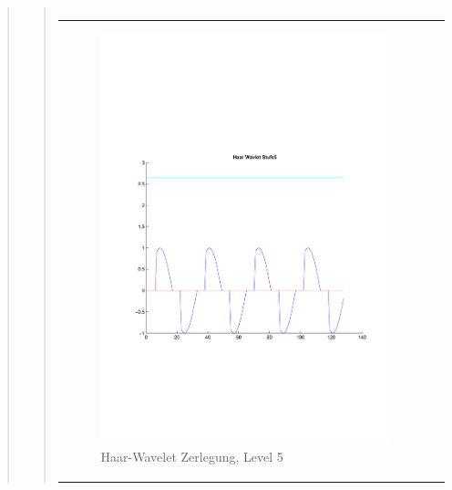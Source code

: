 \begin{quote}
\begin{quote}
\begin{center}
\begin{tabular}{ll}
                \end{tabular}
                \end{center}
    
                
                
                    \begin{center}
                \begin{tabular}{ll}
    
                \hspace{-12em}
                    \begin{minipage}{0.6\textwidth}
    
                        \begin{figure}[H]
                            \label{fig:}
                            \includegraphics[scale=0.45, trim = 0.8cm 6cm 3cm
                            7.5cm,
                            clip]{./Bilder/Termin8/Haar_Wavlet_lvl_5}
                            \caption{Haar-Wavelet Zerlegung, Level 5}
                        \end{figure}
    

\end{minipage}
\end{tabular}
\end{center}
\end{quote}
\end{quote}
